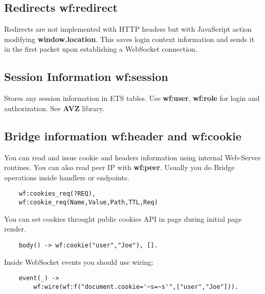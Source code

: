 \subsection{Redirects {\bf wf:redirect}}
Redirects are not implemented with HTTP headers but with JavaScript action modifying {\bf window.location}.
This saves login context information and sends it in the first packet upon establishing a WebSocket connection.

\subsection{Session Information {\bf wf:session}}
Stores any session information in ETS tables. Use {\bf wf:user}, {\bf wf:role} for
login and authorization. See {\bf AVZ} library.

\subsection{Bridge information {\bf wf:header} and {\bf wf:cookie}}
You can read and issue cookie and headers information using internal Web-Server routines.
You can also read peer IP with {\bf wf:peer}. Usually you do Bridge operations
inside handlers or endpoints.

\begin{lstlisting}
    wf:cookies_req(?REQ),
    wf:cookie_req(Name,Value,Path,TTL,Req)
\end{lstlisting}

You can set cookies throught public cookies API in page during initial page render.

\begin{lstlisting}
    body() -> wf:cookie("user","Joe"), [].
\end{lstlisting}

Inside WebSocket events you should use wiring:

\begin{lstlisting}
    event(_) ->
        wf:wire(wf:f("document.cookie='~s=~s'",["user","Joe"])).
\end{lstlisting}
